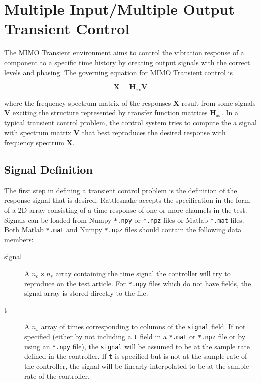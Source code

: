 \documentclass[pdf,12pt,report]{SANDreport}
\newcommand{\inlineCode}{\lstinline[basicstyle=\bfseries\ttfamily]}
\begin{document}
    \chapter{Multiple Input/Multiple Output Transient Control}\label{sec:rattlesnake_environments_mimo_transient}
    
    The \Ac{MIMO} Transient environment aims to control the vibration response of a component to a specific time history by creating output signals with the correct levels and phasing.  The governing equation for \Ac{MIMO} Transient control is 
    
    \begin{equation}\label{eq:forward_mimo_transient}
    \mathbf{X} = {\mathbf{H}_{xv}}\mathbf{V}
    \end{equation}
    
    where the frequency spectrum matrix of the responses $\mathbf{X}$ result from some signals $\mathbf{V}$ exciting the structure represented by transfer function matrices $\mathbf{H}_{xv}$.  In a typical transient control problem, the control system tries to compute the a signal with spectrum matrix $\mathbf{V}$ that best reproduces the desired response with frequency spectrum $\mathbf{X}$.
    
    \section{Signal Definition}
    The first step in defining a transient control problem is the definition of the response signal that is desired.  Rattlesnake accepts the specification in the form of a 2D array consisting of a time response of one or more channels in the test.  Signals can be loaded from Numpy \inlineCode{*.npy} or \inlineCode{*.npz} files or Matlab \inlineCode{*.mat} files.  Both Matlab \inlineCode{*.mat} and Numpy \inlineCode{*.npz} files should contain the following data members:
    
    \begin{description}
           \item[signal] A $n_c \times n_s$ array containing the time signal the controller will try to reproduce on the test article.  For \inlineCode{*.npy} files which do not have fields, the signal array is stored directly to the file.
           \item[t] A $n_s$ array of times corresponding to columns of the \inlineCode{signal} field.  If not specified (either by not including a \inlineCode{t} field in a \inlineCode{*.mat} or \inlineCode{*.npz} file or by using an \inlineCode{*.npy} file), the \inlineCode{signal} will be assumed to be at the sample rate defined in the controller.  If \inlineCode{t} is specified but is not at the sample rate of the controller, the signal will be linearly interpolated to be at the sample rate of the controller.
    \end{description}
      
\end{document}

